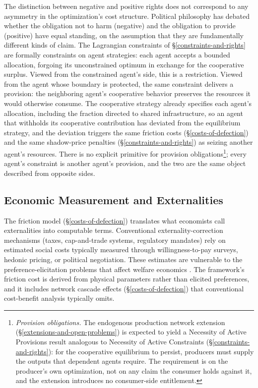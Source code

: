 \documentclass[11pt]{article}
\theoremstyle{plain}
\theoremstyle{definition}
\theoremstyle{remark}
\let\origsubsection\subsection
\renewcommand{\subsection}{\needspace{7\baselineskip}\origsubsection}
\begin{document}
The distinction between negative and positive rights does not correspond
to any asymmetry in the optimization's cost structure. Political
philosophy has debated whether the obligation not to harm (negative) and
the obligation to provide (positive) have equal standing, on the
assumption that they are fundamentally different kinds of claim. The
Lagrangian constraints of §\ref{constraints-and-rights} are formally
constraints on agent strategies: each agent accepts a bounded
allocation, forgoing its unconstrained optimum in exchange for the
cooperative surplus. Viewed from the constrained agent's side, this is a
restriction. Viewed from the agent whose boundary is protected, the same
constraint delivers a provision: the neighboring agent's cooperative
behavior preserves the resources it would otherwise consume. The
cooperative strategy already specifies each agent's allocation,
including the fraction directed to shared infrastructure, so an agent
that withholds its cooperative contribution has deviated from the
equilibrium strategy, and the deviation triggers the same friction costs
(§\ref{costs-of-defection}) and the same shadow-price penalties
(§\ref{constraints-and-rights}) as seizing another agent's resources.
There is no explicit primitive for provision obligations\footnote{\emph{Provision
  obligations.} The endogenous production network extension
  (§\ref{extensions-and-open-problems}) is expected to yield a Necessity
  of Active Provisions result analogous to Necessity of Active
  Constraints (§\ref{constraints-and-rights}): for the cooperative
  equilibrium to persist, producers must supply the outputs that
  dependent agents require. The requirement is on the producer's own
  optimization, not on any claim the consumer holds against it, and the
  extension introduces no consumer-side entitlement.}; every agent's
constraint is another agent's provision, and the two are the same object
described from opposite sides.

\subsection{Economic Measurement and
Externalities}\label{economic-measurement-and-externalities}

The friction model (§\ref{costs-of-defection}) translates what
economists call externalities into computable terms. Conventional
externality-correction mechanisms (taxes, cap-and-trade systems,
regulatory mandates) rely on estimated social costs typically measured
through willingness-to-pay surveys, hedonic pricing, or political
negotiation. These estimates are vulnerable to the
preference-elicitation problems that affect welfare economics
\citep{Chapman2025}. The framework's friction cost is derived from
physical parameters rather than elicited preferences, and it includes
network cascade effects (§\ref{costs-of-defection}) that conventional
cost-benefit analysis typically omits.
\end{document}
